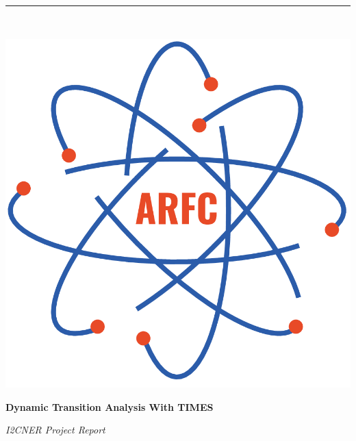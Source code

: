 \documentclass[14pt,a4paper]{article} %
\begin{document}

\begin{titlepage} %
    \newcommand{\HRule}{\rule{\linewidth}{0.5mm}} %
    
    \center %

    
    \HRule\\[0.2cm]
    
     \begin{minipage}{0.4\textwidth}
        \includegraphics[width=\textwidth]{arfc-logo}
        \end{minipage}%
        \begin{minipage}{0.6\textwidth}
        {\begin{flushright}\huge\bfseries Dynamic Transition Analysis With \gls{TIMES} \end{flushright}}
        {\begin{flushright}\large\textit{\gls{I2CNER}  Project Report}\end{flushright}}


\end{minipage}
\end{titlepage}
\end{document}
